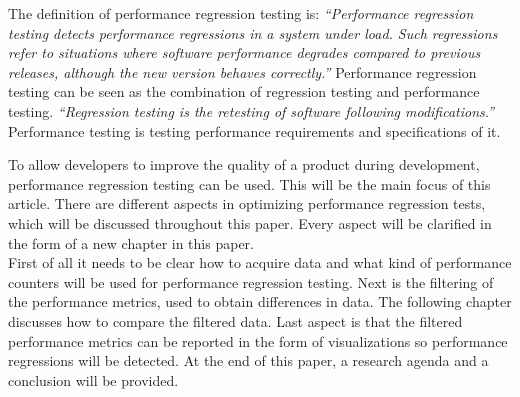 The definition of performance regression testing is: \textit{``Performance regression testing detects performance
regressions in a system under load. Such regressions refer to
situations where software performance degrades compared to
previous releases, although the new version behaves correctly.''\cite{foo2010mining}}
Performance regression testing can be seen as the combination of regression testing and performance testing. \textit{``Regression testing is the retesting of software following modifications.''\cite{rothermel2001prioritizing}} Performance testing is testing performance requirements and specifications of it.\cite{gan2006software}

To allow developers to improve the quality of a product during development, performance regression testing can be used. This will be the main focus of this article. There are different aspects in optimizing performance regression tests, which will be discussed throughout this paper. Every aspect will be clarified in the form of a new chapter in this paper. \\ First of all it needs to be clear how to acquire data and what kind of performance counters will be used for performance regression testing. Next is the filtering of the performance metrics, used to obtain differences in data. The following chapter discusses how to compare the filtered data. Last aspect is that the filtered performance metrics can be reported in the form of visualizations so performance regressions will be detected. At the end of this paper, a research agenda and a conclusion will be provided.

